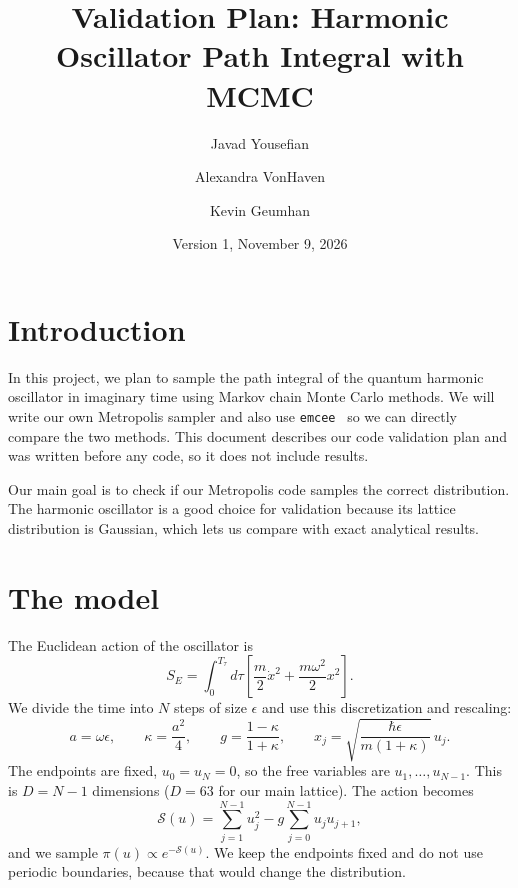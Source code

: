 \documentclass[11pt]{article}
\title{Validation Plan: Harmonic Oscillator Path Integral with MCMC}
\author{Javad Yousefian \and Alexandra VonHaven \and Kevin Geumhan}
\date{Version 1, November 9, 2026}
\begin{document}
\maketitle

\section{Introduction}
In this project, we plan to sample the path integral of the quantum harmonic oscillator in imaginary time using Markov chain Monte Carlo methods. We will write our own Metropolis sampler and also use \texttt{emcee}~\cite{emcee} so we can directly compare the two methods. This document describes our code validation plan and was written before any code, so it does not include results.

Our main goal is to check if our Metropolis code samples the correct distribution. The harmonic oscillator is a good choice for validation because its lattice distribution is Gaussian, which lets us compare with exact analytical results. 

\section{The model}
The Euclidean action of the oscillator is
\begin{equation}
  S_E = \int_0^{T_\tau} d\tau \left[ \frac{m}{2}\dot x^2 + \frac{m\omega^2}{2}x^2 \right].
\end{equation}
We divide the time into $N$ steps of size $\epsilon$ and use this discretization and rescaling:
\begin{equation}
  a = \omega\epsilon, \qquad \kappa = \frac{a^2}{4}, \qquad g = \frac{1-\kappa}{1+\kappa}, \qquad x_j = \sqrt{\frac{\hbar\epsilon}{m(1+\kappa)}}\, u_j .
\end{equation}
The endpoints are fixed, $u_0 = u_N = 0$, so the free variables are $u_1, \dots, u_{N-1}$. This is $D = N-1$ dimensions ($D = 63$ for our main lattice). The action becomes
\begin{equation}
  \mathcal S(u) = \sum_{j=1}^{N-1} u_j^2 - g \sum_{j=0}^{N-1} u_j u_{j+1},
  \label{eq:action}
\end{equation}
and we sample $\pi(u) \propto e^{-\mathcal S(u)}$. We keep the endpoints fixed and do not use periodic boundaries, because that would change the distribution.
\end{document}
